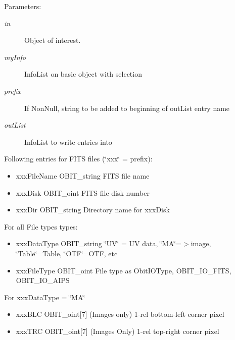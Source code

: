 \begin{Desc}
\item[Parameters:]
\begin{description}
\item[{\em in}]Object of interest. \item[{\em my\-Info}]Info\-List on basic object with selection \item[{\em prefix}]If Non\-Null, string to be added to beginning of out\-List entry name \item[{\em out\-List}]Info\-List to write entries into\end{description}
\end{Desc}
Following entries for FITS files (\char`\"{}xxx\char`\"{} = prefix): \begin{itemize}
\item xxx\-File\-Name OBIT\_\-string FITS file name \item xxx\-Disk OBIT\_\-oint FITS file disk number \item xxx\-Dir OBIT\_\-string Directory name for xxx\-Disk\end{itemize}
For all File types types: \begin{itemize}
\item xxx\-Data\-Type OBIT\_\-string \char`\"{}UV\char`\"{} = UV data, \char`\"{}MA\char`\"{}=$>$image, \char`\"{}Table\char`\"{}=Table, \char`\"{}OTF\char`\"{}=OTF, etc \item xxx\-File\-Type OBIT\_\-oint File type as Obit\-IOType, OBIT\_\-IO\_\-FITS, OBIT\_\-IO\_\-AIPS\end{itemize}
For xxx\-Data\-Type = \char`\"{}MA\char`\"{} \begin{itemize}
\item xxx\-BLC OBIT\_\-oint[7] (Images only) 1-rel bottom-left corner pixel \item xxx\-TRC OBIT\_\-oint[7] (Images Only) 1-rel top-right corner pixel 
\end{itemize}
